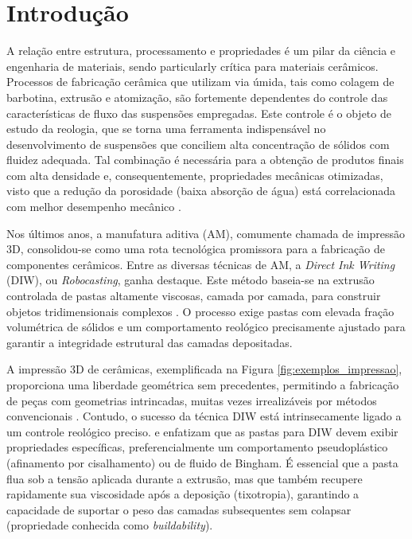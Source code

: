 \documentclass[article,12pt,oneside,a4paper,english,brazil,sumario=tradicional]{abntex2}
\begin{document}
\section{Introdução}
\label{sec:introducao}
\normalsize
A relação entre estrutura, processamento e propriedades é um pilar da ciência e engenharia de materiais, sendo particularly crítica para materiais cerâmicos. Processos de fabricação cerâmica que utilizam via úmida, tais como colagem de barbotina, extrusão e atomização, são fortemente dependentes do controle das características de fluxo das suspensões empregadas. Este controle é o objeto de estudo da reologia, que se torna uma ferramenta indispensável no desenvolvimento de suspensões que conciliem alta concentração de sólidos com fluidez adequada. Tal combinação é necessária para a obtenção de produtos finais com alta densidade e, consequentemente, propriedades mecânicas otimizadas, visto que a redução da porosidade (baixa absorção de água) está correlacionada com melhor desempenho mecânico .

Nos últimos anos, a manufatura aditiva (AM), comumente chamada de impressão 3D, consolidou-se como uma rota tecnológica promissora para a fabricação de componentes cerâmicos. Entre as diversas técnicas de AM, a \textit{Direct Ink Writing} (DIW), ou \textit{Robocasting}, ganha destaque. Este método baseia-se na extrusão controlada de pastas altamente viscosas, camada por camada, para construir objetos tridimensionais complexos . O processo exige pastas com elevada fração volumétrica de sólidos e um comportamento reológico precisamente ajustado para garantir a integridade estrutural das camadas depositadas.

A impressão 3D de cerâmicas, exemplificada na Figura \ref{fig:exemplos_impressao}, proporciona uma liberdade geométrica sem precedentes, permitindo a fabricação de peças com geometrias intrincadas, muitas vezes irrealizáveis por métodos convencionais . Contudo, o sucesso da técnica DIW está intrinsecamente ligado a um controle reológico preciso.  e  enfatizam que as pastas para DIW devem exibir propriedades específicas, preferencialmente um comportamento pseudoplástico (afinamento por cisalhamento) ou de fluido de Bingham. É essencial que a pasta flua sob a tensão aplicada durante a extrusão, mas que também recupere rapidamente sua viscosidade após a deposição (tixotropia), garantindo a capacidade de suportar o peso das camadas subsequentes sem colapsar (propriedade conhecida como \textit{buildability}).
\end{document}
